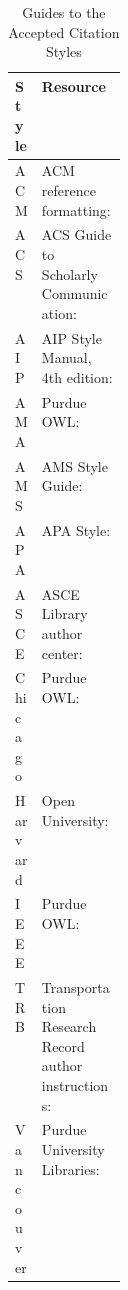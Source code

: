 \begin{table}
\centering
\caption{Guides to the Accepted Citation Styles}
\label{tab:style-resources}
\begin{tabularx}{\linewidth}{>{\raggedright\arraybackslash}p{0.13\linewidth}>{\raggedright\arraybackslash}X}
\toprule
\textbf{Style} & \textbf{Resource} \\
\midrule
ACM & ACM reference formatting:\newline {\small\url{https://www.acm.org/publications/authors/reference-formatting}} \\
\addlinespace
ACS & ACS Guide to Scholarly Communication:\newline {\small\url{https://pubs.acs.org/books/pages/acsguide}} \\
\addlinespace
AIP & AIP Style Manual, 4th edition:\newline {\small\url{https://publishing.aip.org/wp-content/uploads/2021/03/AIP_Style_4thed.pdf}} \\
\addlinespace
AMA & Purdue OWL:\newline {\small\url{https://owl.purdue.edu/owl/research_and_citation/ama_style/index.html}} \\
\addlinespace
AMS & AMS Style Guide:\newline {\small\url{https://www.ams.org/publications/authors/AMS-StyleGuide-online.pdf}} \\
\addlinespace
APA & APA Style:\newline {\small\url{https://apastyle.apa.org}} \\
\addlinespace
ASCE & ASCE Library author center:\newline {\small\url{https://ascelibrary.org/author-center/preparing-manuscript}} \\
\addlinespace
Chicago & Purdue OWL:\newline {\small\url{https://owl.purdue.edu/owl/research_and_citation/chicago_manual_17th_edition/chicago_style_introduction.html}} \\
\addlinespace
Harvard & Open University:\newline {\small\url{https://university.open.ac.uk/library/referencing-and-plagiarism/quick-guide-to-harvard-referencing-cite-them-right}} \\
\addlinespace
IEEE & Purdue OWL:\newline {\small\url{https://owl.purdue.edu/owl/research_and_citation/ieee_style/ieee_overview.html}} \\
\addlinespace
TRB & Transportation Research Record author instructions:\newline {\small\url{https://trb.secure-platform.com/a/page/trrjournal/forauthors}} \\
\addlinespace
Vancouver & Purdue University Libraries:\newline {\small\url{https://guides.lib.purdue.edu/BMEQual/VancouverStyle}} \\
\bottomrule
\end{tabularx}
\end{table}

